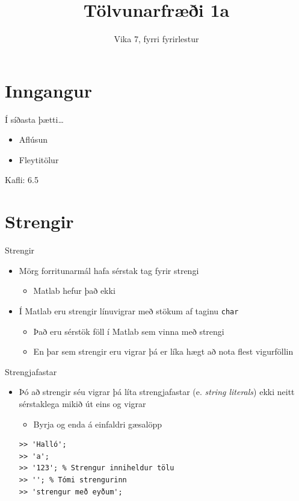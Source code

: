 \documentclass[handout]{beamer}
\title{Tölvunarfræði 1a}
\subtitle{Vika 7, fyrri fyrirlestur}
\begin{document}
\begin{frame}
\titlepage
\end{frame}

\section{Inngangur}

\begin{frame}{Í síðasta þætti\ldots}
\begin{itemize}
 \item Aflúsun
 \item Fleytitölur
\end{itemize}
Kafli: 6.5
\end{frame}

\section{Strengir}

\begin{frame}{Strengir}
\begin{itemize}
 \item Mörg forritunarmál hafa sérstak tag fyrir strengi
 \begin{itemize}
  \item Matlab hefur það ekki
 \end{itemize}
 \item Í Matlab eru strengir línuvigrar með stökum af taginu \texttt{char}
 \begin{itemize}
  \item Það eru sérstök föll í Matlab sem vinna með strengi
  \item En þar sem strengir eru vigrar þá er líka hægt að nota flest vigurföllin
 \end{itemize}
\end{itemize}
\end{frame}

\begin{frame}[fragile]{Strengjafastar}
\begin{itemize}
 \item Þó að strengir séu vigrar þá líta strengjafastar (e. \emph{string literals}) ekki neitt sérstaklega mikið út eins og vigrar
 \begin{itemize}
  \item Byrja og enda á einfaldri gæsalöpp
 \end{itemize}
\begin{verbatim}
>> 'Halló';
>> 'a';
>> '123'; % Strengur inniheldur tölu
>> ''; % Tómi strengurinn
>> 'strengur með eyðum';
\end{verbatim}
\end{itemize}
\end{frame}
\end{document}
